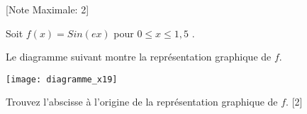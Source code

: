 \begin{question}
  \hspace*{\fill} [Note Maximale: 2]\par
  \medskip
  \noindent Soit $f(x) = Sin(ex)$ pour $0 \le x \le 1,5$ .\par
  \medskip
  \begin{center} %
    \noindent Le diagramme suivant montre la représentation graphique de $f$.\par
    \texttt{[image: diagramme\_x19]}\par
  \end{center} %

  \medskip
  \noindent Trouvez l'abscisse à l'origine de la représentation graphique de $f$.\hspace*{\fill} [2]\par
  
\end{question}
